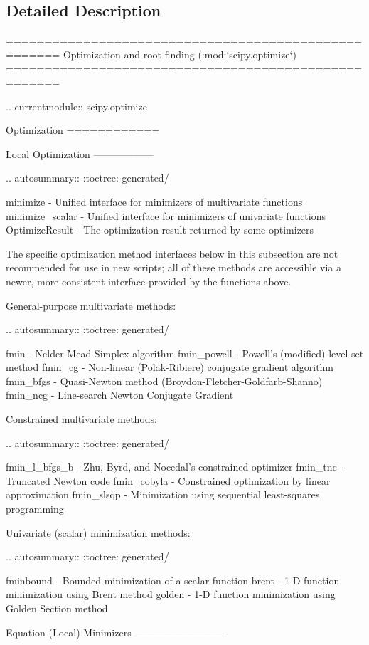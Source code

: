 \subsection{Detailed Description}
\begin{DoxyVerb}=====================================================
Optimization and root finding (:mod:`scipy.optimize`)
=====================================================

.. currentmodule:: scipy.optimize

Optimization
============

Local Optimization
------------------

.. autosummary::
   :toctree: generated/

   minimize - Unified interface for minimizers of multivariate functions
   minimize_scalar - Unified interface for minimizers of univariate functions
   OptimizeResult - The optimization result returned by some optimizers

The specific optimization method interfaces below in this subsection are
not recommended for use in new scripts; all of these methods are accessible
via a newer, more consistent interface provided by the functions above.

General-purpose multivariate methods:

.. autosummary::
   :toctree: generated/

   fmin - Nelder-Mead Simplex algorithm
   fmin_powell - Powell's (modified) level set method
   fmin_cg - Non-linear (Polak-Ribiere) conjugate gradient algorithm
   fmin_bfgs - Quasi-Newton method (Broydon-Fletcher-Goldfarb-Shanno)
   fmin_ncg - Line-search Newton Conjugate Gradient

Constrained multivariate methods:

.. autosummary::
   :toctree: generated/

   fmin_l_bfgs_b - Zhu, Byrd, and Nocedal's constrained optimizer
   fmin_tnc - Truncated Newton code
   fmin_cobyla - Constrained optimization by linear approximation
   fmin_slsqp - Minimization using sequential least-squares programming

Univariate (scalar) minimization methods:

.. autosummary::
   :toctree: generated/

   fminbound - Bounded minimization of a scalar function
   brent - 1-D function minimization using Brent method
   golden - 1-D function minimization using Golden Section method

Equation (Local) Minimizers
---------------------------


\end{DoxyVerb}
